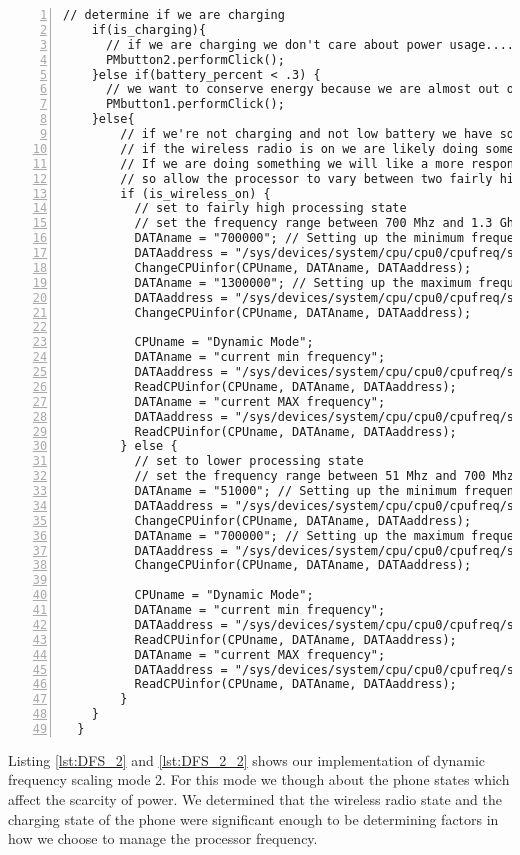 \documentclass{article} %
\begin{document}
\begin{lstlisting}[float=*,caption={Dynamic Frequency Scaling Mode II (continued)},label={lst:DFS_2_2},numbers=left]
// determine if we are charging
    if(is_charging){
      // if we are charging we don't care about power usage.... set to high performance mode
      PMbutton2.performClick();
    }else if(battery_percent < .3) {
      // we want to conserve energy because we are almost out of it, set to low performance mode
      PMbutton1.performClick();
    }else{
        // if we're not charging and not low battery we have some decisions to make
        // if the wireless radio is on we are likely doing something online.
        // If we are doing something we will like a more responsive device
        // so allow the processor to vary between two fairly high frequency states
        if (is_wireless_on) {
          // set to fairly high processing state
          // set the frequency range between 700 Mhz and 1.3 Ghz
          DATAname = "700000"; // Setting up the minimum frequency 51 Mhz
          DATAaddress = "/sys/devices/system/cpu/cpu0/cpufreq/scaling_min_freq";
          ChangeCPUinfor(CPUname, DATAname, DATAaddress);
          DATAname = "1300000"; // Setting up the maximum frequency at 1300 MHz
          DATAaddress = "/sys/devices/system/cpu/cpu0/cpufreq/scaling_max_freq";
          ChangeCPUinfor(CPUname, DATAname, DATAaddress);

          CPUname = "Dynamic Mode";
          DATAname = "current min frequency";
          DATAaddress = "/sys/devices/system/cpu/cpu0/cpufreq/scaling_min_freq";
          ReadCPUinfor(CPUname, DATAname, DATAaddress);
          DATAname = "current MAX frequency";
          DATAaddress = "/sys/devices/system/cpu/cpu0/cpufreq/scaling_max_freq";
          ReadCPUinfor(CPUname, DATAname, DATAaddress);
        } else {
          // set to lower processing state
          // set the frequency range between 51 Mhz and 700 Mhz
          DATAname = "51000"; // Setting up the minimum frequency 51 Mhz
          DATAaddress = "/sys/devices/system/cpu/cpu0/cpufreq/scaling_min_freq";
          ChangeCPUinfor(CPUname, DATAname, DATAaddress);
          DATAname = "700000"; // Setting up the maximum frequency at 1300 MHz
          DATAaddress = "/sys/devices/system/cpu/cpu0/cpufreq/scaling_max_freq";
          ChangeCPUinfor(CPUname, DATAname, DATAaddress);

          CPUname = "Dynamic Mode";
          DATAname = "current min frequency";
          DATAaddress = "/sys/devices/system/cpu/cpu0/cpufreq/scaling_min_freq";
          ReadCPUinfor(CPUname, DATAname, DATAaddress);
          DATAname = "current MAX frequency";
          DATAaddress = "/sys/devices/system/cpu/cpu0/cpufreq/scaling_max_freq";
          ReadCPUinfor(CPUname, DATAname, DATAaddress);
        }
    }
  }
\end{lstlisting}
Listing \ref{lst:DFS_2} and \ref{lst:DFS_2_2} shows our implementation of dynamic frequency scaling mode 2. For this mode we though about the phone states which affect the scarcity of power. We determined that the wireless radio state and the charging state of the phone were significant enough to be determining factors in how we choose to manage the processor frequency.
\end{document}
